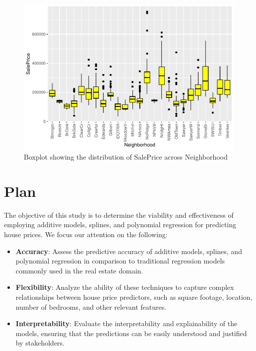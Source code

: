 \documentclass[aoas]{imsart}
\numberwithin{equation}{section}
\theoremstyle{plain}
\theoremstyle{remark}
\begin{document}
\begin{figure}
\centering
\includegraphics{STAT-444-FINAL-PROJECT-PROPOSAL_files/figure-latex/unnamed-chunk-9-1.pdf}
\caption{Boxplot showing the distribution of SalePrice across
Neighborhood\label{}}
\end{figure}

\hypertarget{plan}{%
\section{Plan}\label{plan}}

The objective of this study is to determine the viability and
effectiveness of employing additive models, splines, and polynomial
regression for predicting house prices. We focus our attention on the
following:

\begin{itemize}
\item
  \textbf{Accuracy}: Assess the predictive accuracy of additive models,
  splines, and polynomial regression in comparison to traditional
  regression models commonly used in the real estate domain.
    \vspace{0.2cm}
\item
  \textbf{Flexibility}: Analyze the ability of these techniques to
  capture complex relationships between house price predictors, such as
  square footage, location, number of bedrooms, and other relevant
  features.
  \vspace{0.2cm}
\item
  \textbf{Interpretability}: Evaluate the interpretability and
  explainability of the models, ensuring that the predictions can be
  easily understood and justified by stakeholders.
  \vspace{0.2cm}
\end{itemize}
\end{document}
